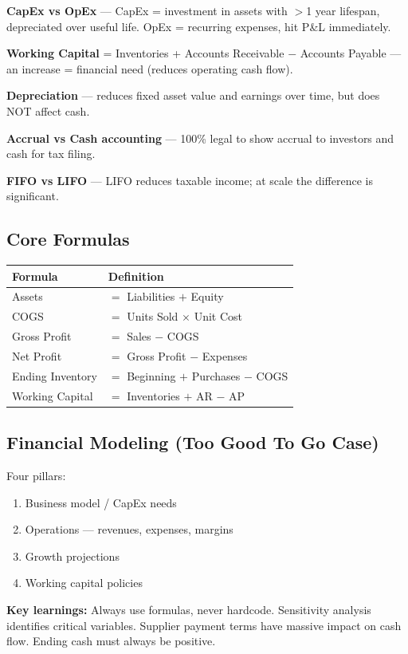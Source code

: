 \documentclass[a4paper,11pt]{article}
\begin{document}
\textbf{CapEx vs OpEx} --- CapEx = investment in assets with $>$1 year lifespan, depreciated over useful life. OpEx = recurring expenses, hit P\&L immediately.

\textbf{Working Capital} = Inventories + Accounts Receivable $-$ Accounts Payable --- an increase = financial need (reduces operating cash flow).

\textbf{Depreciation} --- reduces fixed asset value and earnings over time, but does NOT affect cash.

\textbf{Accrual vs Cash accounting} --- 100\% legal to show accrual to investors and cash for tax filing.

\textbf{FIFO vs LIFO} --- LIFO reduces taxable income; at scale the difference is significant.

\subsection{Core Formulas}

\begin{tabular}{@{}ll@{}}
\toprule
\textbf{Formula} & \textbf{Definition} \\
\midrule
Assets & $=$ Liabilities $+$ Equity \\
COGS & $=$ Units Sold $\times$ Unit Cost \\
Gross Profit & $=$ Sales $-$ COGS \\
Net Profit & $=$ Gross Profit $-$ Expenses \\
Ending Inventory & $=$ Beginning $+$ Purchases $-$ COGS \\
Working Capital & $=$ Inventories $+$ AR $-$ AP \\
\bottomrule
\end{tabular}

\subsection{Financial Modeling (Too Good To Go Case)}

Four pillars:
\begin{enumerate}
\item Business model / CapEx needs
\item Operations --- revenues, expenses, margins
\item Growth projections
\item Working capital policies
\end{enumerate}

\textbf{Key learnings:} Always use formulas, never hardcode. Sensitivity analysis identifies critical variables. Supplier payment terms have massive impact on cash flow. Ending cash must always be positive.
\end{document}
